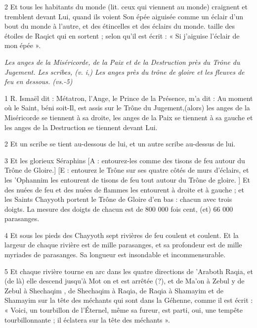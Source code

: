 \par 2 Et tous les habitants du monde (lit. ceux qui viennent au monde) craignent et tremblent devant Lui, quand ils voient Son épée aiguisée comme un éclair d'un bout du monde à l'autre, et des étincelles et des éclairs du monde. taille des étoiles de Raqict qui en sortent ; selon qu'il est écrit : « Si j'aiguise l'éclair de mon épée ».



\par \textit{Les anges de la Miséricorde, de la Paix et de la Destruction près du Trône du Jugement. Les scribes, (v. i,) Les anges près du trône de gloire et les fleuves de feu en dessous. (vs.-5)}

\par 1 R. Ismaël dit : Métatron, l'Ange, le Prince de la Présence, m'a dit : Au moment où le Saint, béni soit-Il, est assis sur le Trône du Jugement,(alors) les anges de la Miséricorde se tiennent à sa droite, les anges de la Paix se tiennent à sa gauche et les anges de la Destruction se tiennent devant Lui.

\par 2 Et un scribe se tient au-dessous de lui, et un autre scribe au-dessus de lui.

\par 3 Et les glorieux Séraphins [A : entourez-les comme des tisons de feu autour du Trône de Gloire.] [E : entourez le Trône sur ses quatre côtés de murs d'éclairs, et les 'Ophannim les entourent de tisons de feu tout autour du Trône de gloire. ] Et des nuées de feu et des nuées de flammes les entourent à droite et à gauche ; et les Saints Chayyoth portent le Trône de Gloire d'en bas : chacun avec trois doigts. La mesure des doigts de chacun est de 800 000 fois cent, (et) 66 000 parasanges.

\par 4 Et sous les pieds des Chayyoth sept rivières de feu coulent et coulent. Et la largeur de chaque rivière est de mille parasanges, et sa profondeur est de mille myriades de parasanges. Sa longueur est insondable et incommensurable.

\par 5 Et chaque rivière tourne en arc dans les quatre directions de 'Araboth Raqia, et (de là) elle descend jusqu'à Mot on et est arrêtée (?), et de Ma'on à Zebul y de Zebul à Shechaqim , de Shechaqim à Raqia, de Raqia à Shamayim et de Shamayim sur la tête des méchants qui sont dans la Géhenne, comme il est écrit : « Voici, un tourbillon de l'Éternel, même sa fureur, est parti, oui, une tempête tourbillonnante ; il éclatera sur la tête des méchants ».

